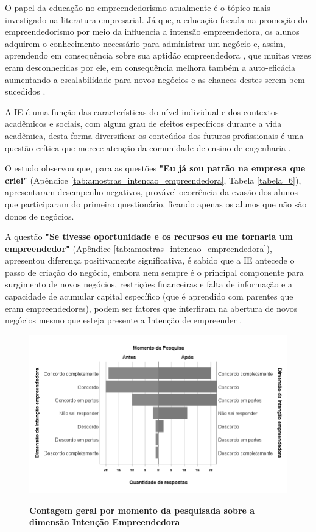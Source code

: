 O papel da educação no empreendedorismo atualmente é o tópico mais  investigado na literatura empresarial. Já que, a educação focada na promoção do empreendedorismo por meio da influencia a intensão empreendedora, os alunos adquirem o conhecimento necessário para administrar um negócio e, assim, aprendendo em consequência sobre sua aptidão empreendedora \cite{nowinski_impact_2019}, que muitas vezes eram desconhecidas por ele, em consequência melhora também a auto-eficácia \cite{egerova_does_2017} aumentando a escalabilidade para novos negócios e as chances destes serem bem-sucedidos \cite{kolstad_education_2015}.

A IE é uma função das características do nível individual e dos contextos acadêmicos e sociais, com algum grau de efeitos específicos durante a vida acadêmica, desta forma diversificar os conteúdos dos futuros profissionais é uma questão crítica que merece atenção da comunidade de ensino de engenharia \cite{gilmartin_entrepreneurial_2019}.

O estudo observou que, para as questões \textbf{"Eu já sou patrão na empresa que criei"} (Apêndice \ref{tab:amostras_intencao_empreendedora}, Tabela \ref{tabela_6}), apresentaram desempenho negativos, provável ocorrência da evasão dos alunos que participaram do primeiro questionário, ficando apenas os alunos que não são donos de negócios. 


A questão \textbf{"Se tivesse oportunidade e os recursos eu me tornaria um empreendedor"} (Apêndice \ref{tab:amostras_intencao_empreendedora}), apresentou diferença positivamente significativa, é sabido que a IE antecede o passo de criação do negócio, embora nem sempre é o principal componente para surgimento de novos negócios, restrições financeiras e falta de informação e a capacidade de acumular capital específico (que é aprendido com parentes que eram empreendedores), podem ser fatores que interfiram na abertura de novos negócios mesmo que esteja presente a Intenção de empreender \cite{auguste_what_2016}.



\begin{figure}[H]
\centering
\caption{\textbf{Contagem geral por momento da pesquisada sobre a dimensão Intenção Empreendedora}}
\includegraphics[scale=0.6]{Imagens/intencao_empreendedora.png}
\label{figura_45}
\end{figure}




